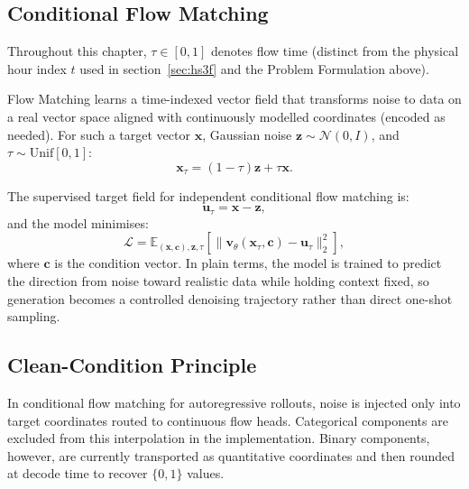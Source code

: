 \subsection{Conditional Flow Matching}

Throughout this chapter, $\tau \in [0,1]$ denotes flow time (distinct from the physical hour index $t$ used in section~\ref{sec:hs3f} and the Problem Formulation above).

Flow Matching \cite{lipman2023flow} learns a time-indexed vector field that transforms noise to data on a real vector space aligned with continuously modelled coordinates (encoded as needed).
For such a target vector $\mathbf{x}$, Gaussian noise $\mathbf{z}\sim\mathcal{N}(0,I)$, and $\tau\sim\mathrm{Unif}[0,1]$:
\begin{equation}
\mathbf{x}_\tau = (1-\tau)\mathbf{z} + \tau\mathbf{x}.
\end{equation}

The supervised target field for independent conditional flow matching \cite{tong2024cfm} is:
\begin{equation}
\mathbf{u}_\tau = \mathbf{x} - \mathbf{z},
\end{equation}
and the model minimises:
\begin{equation}
\mathcal{L} = \mathbb{E}_{(\mathbf{x},\mathbf{c}),\mathbf{z},\tau}\left[\|\mathbf{v}_{\theta}(\mathbf{x}_\tau,\mathbf{c}) - \mathbf{u}_\tau\|_2^2\right],
\end{equation}
where $\mathbf{c}$ is the condition vector.
In plain terms, the model is trained to predict the direction from noise toward realistic data while holding context fixed, so generation becomes a controlled denoising trajectory rather than direct one-shot sampling.

\subsection{Clean-Condition Principle}

In conditional flow matching for autoregressive rollouts, noise is injected only into target coordinates routed to continuous flow heads. Categorical components are excluded from this interpolation in the implementation. Binary components, however, are currently transported as quantitative coordinates and then rounded at decode time to recover $\{0,1\}$ values.

